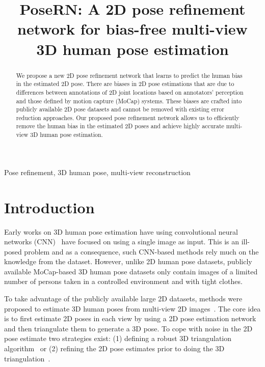 \documentclass{article}
\title{PoseRN: A 2D pose refinement network for bias-free multi-view \\3D human pose estimation}
\begin{document}
\maketitle

\begin{abstract}

We propose a new 2D pose refinement network that learns to predict the human bias in the estimated 2D pose. There are biases in 2D pose estimations that are due to differences between annotations of 2D joint locations based on annotators' perception and those defined by motion capture (MoCap) systems. These biases are crafted into publicly available 2D pose datasets and cannot be removed with existing error reduction approaches.
Our proposed pose refinement network allows us to efficiently remove the human bias in the estimated 2D poses and achieve highly accurate multi-view 3D human pose estimation.
\end{abstract}
\begin{keywords}
Pose refinement, 3D human pose, multi-view reconstruction
\end{keywords}
\vspace{-0.2cm}
\section{Introduction}\label{sec:intro}
\vspace{-0.2cm}

Early works on 3D human pose estimation have using convolutional neural networks (CNN)~\cite{kolotouros2019learning, cheng2019occlusion, Sun2018integral, Martinez_2017_ICCV,zhou2017towards, NibaliHMP19} have focused on using a single image as input.
This is an ill-posed problem and as a consequence, such CNN-based methods rely much on the knowledge from the dataset. However, unlike 2D human pose datasets, publicly available MoCap-based 3D human pose datasets only contain images of a limited number of persons taken in a controlled environment and with tight clothes.

To take advantage of the publicly available large 2D datasets, methods were proposed to estimate 3D human poses from multi-view 2D images~\cite{iskakov2019learnable, multiviewpose, Joo2017panoptic, zhou2019hemlets, pavlakos2017harvesting, tome2018rethinking}. 
The core idea is to first estimate 2D poses in each view by using a 2D pose estimation network and then triangulate them to generate a 3D pose. To cope with noise in the 2D pose estimate two strategies exist: (1) defining a robust 3D triangulation algorithm~\cite{iskakov2019learnable, Joo2017panoptic, zhou2019hemlets} or (2) refining the 2D pose estimates prior to doing the 3D triangulation~\cite{multiviewpose, pavlakos2017harvesting, tome2018rethinking}.
\end{document}
